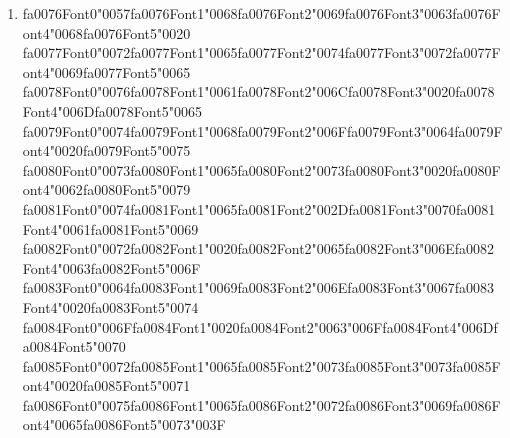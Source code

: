 \documentclass[12pt]{article}
\begin{document}
\begin{enumerate}[label=Q\arabic*.]
\begin{enumerate}[label=(\Alph*)]
    \item Grounding generations by retrieving external sources
    \item Increasing the parameter count to store more facts
    \item Replacing tokenization with sub-word merges
    \item Eliminating the need for instruction tuning
\end{enumerate}
\item {\csname fa0076Font0\endcsname\char"0057}{\csname fa0076Font1\endcsname\char"0068}{\csname fa0076Font2\endcsname\char"0069}{\csname fa0076Font3\endcsname\char"0063}{\csname fa0076Font4\endcsname\char"0068}{\csname fa0076Font5\endcsname\char"0020} {\csname fa0077Font0\endcsname\char"0072}{\csname fa0077Font1\endcsname\char"0065}{\csname fa0077Font2\endcsname\char"0074}{\csname fa0077Font3\endcsname\char"0072}{\csname fa0077Font4\endcsname\char"0069}{\csname fa0077Font5\endcsname\char"0065} {\csname fa0078Font0\endcsname\char"0076}{\csname fa0078Font1\endcsname\char"0061}{\csname fa0078Font2\endcsname\char"006C}{\csname fa0078Font3\endcsname\char"0020}{\csname fa0078Font4\endcsname\char"006D}{\csname fa0078Font5\endcsname\char"0065} {\csname fa0079Font0\endcsname\char"0074}{\csname fa0079Font1\endcsname\char"0068}{\csname fa0079Font2\endcsname\char"006F}{\csname fa0079Font3\endcsname\char"0064}{\csname fa0079Font4\endcsname\char"0020}{\csname fa0079Font5\endcsname\char"0075} {\csname fa0080Font0\endcsname\char"0073}{\csname fa0080Font1\endcsname\char"0065}{\csname fa0080Font2\endcsname\char"0073}{\csname fa0080Font3\endcsname\char"0020}{\csname fa0080Font4\endcsname\char"0062}{\csname fa0080Font5\endcsname\char"0079} {\csname fa0081Font0\endcsname\char"0074}{\csname fa0081Font1\endcsname\char"0065}{\csname fa0081Font2\endcsname\char"002D}{\csname fa0081Font3\endcsname\char"0070}{\csname fa0081Font4\endcsname\char"0061}{\csname fa0081Font5\endcsname\char"0069} {\csname fa0082Font0\endcsname\char"0072}{\csname fa0082Font1\endcsname\char"0020}{\csname fa0082Font2\endcsname\char"0065}{\csname fa0082Font3\endcsname\char"006E}{\csname fa0082Font4\endcsname\char"0063}{\csname fa0082Font5\endcsname\char"006F} {\csname fa0083Font0\endcsname\char"0064}{\csname fa0083Font1\endcsname\char"0069}{\csname fa0083Font2\endcsname\char"006E}{\csname fa0083Font3\endcsname\char"0067}{\csname fa0083Font4\endcsname\char"0020}{\csname fa0083Font5\endcsname\char"0074} {\csname fa0084Font0\endcsname\char"006F}{\csname fa0084Font1\endcsname\char"0020}{\csname fa0084Font2\endcsname\char"0063}{\char"006F}{\csname fa0084Font4\endcsname\char"006D}{\csname fa0084Font5\endcsname\char"0070} {\csname fa0085Font0\endcsname\char"0072}{\csname fa0085Font1\endcsname\char"0065}{\csname fa0085Font2\endcsname\char"0073}{\csname fa0085Font3\endcsname\char"0073}{\csname fa0085Font4\endcsname\char"0020}{\csname fa0085Font5\endcsname\char"0071} {\csname fa0086Font0\endcsname\char"0075}{\csname fa0086Font1\endcsname\char"0065}{\csname fa0086Font2\endcsname\char"0072}{\csname fa0086Font3\endcsname\char"0069}{\csname fa0086Font4\endcsname\char"0065}{\csname fa0086Font5\endcsname\char"0073}{\char"003F}

\end{enumerate}
\end{document}
